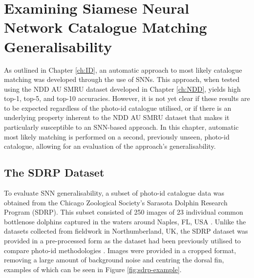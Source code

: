 \section{Examining Siamese Neural Network Catalogue Matching Generalisability }\label{ch:SNNEvaluation,sec:SDRP}

As outlined in Chapter \ref{ch:ID}, an automatic approach to most likely catalogue matching was developed through the use of SNNs. This approach, when tested using the NDD AU SMRU dataset developed in Chapter \ref{ch:NDD}, yields high top-1, top-5, and top-10 accuracies. However, it is not yet clear if these results are to be expected regardless of the photo-id catalogue utilised, or if there is an underlying property inherent to the NDD AU SMRU dataset that makes it particularly susceptible to an SNN-based approach. In this chapter, automatic most likely matching is performed on a second, previously unseen, photo-id catalogue, allowing for an evaluation of the approach's generalisability.

\subsection{The SDRP Dataset}\label{ch:SNNEvaluation,sec:SDRP,sub:SDRPDataset}

To evaluate SNN generalisability, a subset of photo-id catalogue data was obtained from the Chicago Zoological Society's Sarasota Dolphin Research Program (SDRP). This subset consisted of 250 images of 23 individual common bottlenose dolphins captured in the waters around Naples, FL, USA \cite{tyson_moore_final_2020}. Unlike the datasets collected from fieldwork in Northumberland, UK, the SDRP dataset was provided in a pre-processed form as the dataset had been previously utilised to compare photo-id methodologies \cite{tyson_moore_rise_2022}. Images were provided in a cropped format, removing a large amount of background noise and centring the dorsal fin, examples of which can be seen in Figure \ref{fig:sdrp-example}. 

